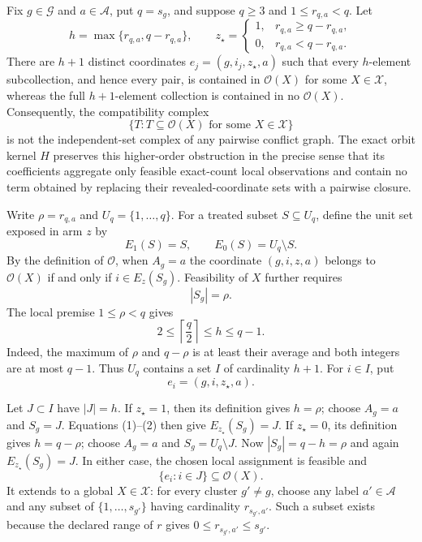Fix \(g\in\mathcal G\) and \(a\in\mathcal A\), put \(q=s_g\), and suppose \(q\ge 3\) and \(1\le r_{q,a}<q\).  Let
\[
 h=\max\{r_{q,a},q-r_{q,a}\},
 \qquad
 z_\star=\begin{cases}
 1,&r_{q,a}\ge q-r_{q,a},\\
 0,&r_{q,a}<q-r_{q,a}.
 \end{cases}
\]
There are \(h+1\) distinct coordinates \(e_j=(g,i_j,z_\star,a)\) such that every \(h\)-element subcollection, and hence every pair, is contained in \(\mathcal O(X)\) for some \(X\in\mathcal X\), whereas the full \(h+1\)-element collection is contained in no \(\mathcal O(X)\).  Consequently, the compatibility complex
\[
 \bigl\{T:T\subseteq\mathcal O(X)\text{ for some }X\in\mathcal X\bigr\}
\]
is not the independent-set complex of any pairwise conflict graph.  The exact orbit kernel \(H\) preserves this higher-order obstruction in the precise sense that its coefficients aggregate only feasible exact-count local observations and contain no term obtained by replacing their revealed-coordinate sets with a pairwise closure.

Write \(\rho=r_{q,a}\) and \(U_q=\{1,\ldots,q\}\).  For a treated subset \(S\subseteq U_q\), define the unit set exposed in arm \(z\) by
\[
 E_1(S)=S,
 \qquad
 E_0(S)=U_q\setminus S.
 \tag{1}
\]
By the definition of \(\mathcal O\), when \(A_g=a\) the coordinate \((g,i,z,a)\) belongs to \(\mathcal O(X)\) if and only if \(i\in E_z(S_g)\).  Feasibility of \(X\) further requires
\[
 |S_g|=\rho.
 \tag{2}
\]
The local premise \(1\le\rho<q\) gives
\[
 2\le \left\lceil\frac q2\right\rceil\le h\le q-1.
 \tag{3}
\]
Indeed, the maximum of \(\rho\) and \(q-\rho\) is at least their average and both integers are at most \(q-1\).  Thus \(U_q\) contains a set \(I\) of cardinality \(h+1\).  For \(i\in I\), put
\[
 e_i=(g,i,z_\star,a).
 \tag{4}
\]

Let \(J\subset I\) have \(|J|=h\).  If \(z_\star=1\), then its definition gives \(h=\rho\); choose \(A_g=a\) and \(S_g=J\).  Equations (1)--(2) then give \(E_{z_\star}(S_g)=J\).  If \(z_\star=0\), its definition gives \(h=q-\rho\); choose \(A_g=a\) and \(S_g=U_q\setminus J\).  Now \(|S_g|=q-h=\rho\) and again \(E_{z_\star}(S_g)=J\).  In either case, the chosen local assignment is feasible and
\[
 \{e_i:i\in J\}\subseteq\mathcal O(X).
 \tag{5}
\]
It extends to a global \(X\in\mathcal X\): for every cluster \(g'\ne g\), choose any label \(a'\in\mathcal A\) and any subset of \(\{1,\ldots,s_{g'}\}\) having cardinality \(r_{s_{g'},a'}\).  Such a subset exists because the declared range of \(r\) gives
\(0\le r_{s_{g'},a'}\le s_{g'}\).

